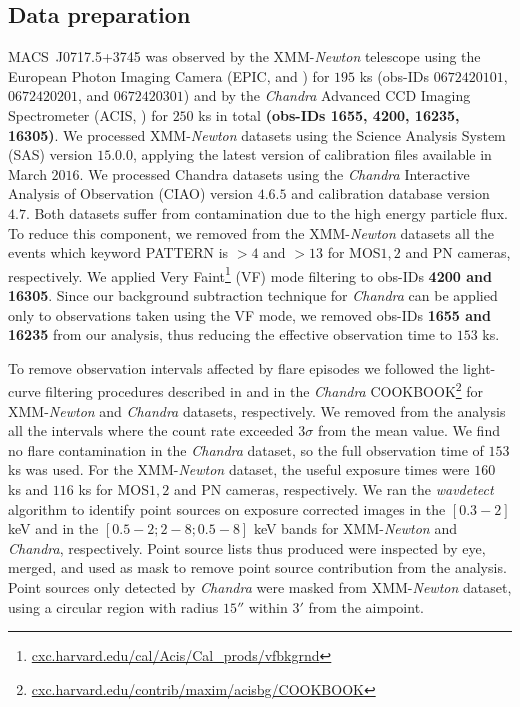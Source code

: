 \documentclass[twocolumn,traditabstract]{aa}
\begin{document}
\subsection{Data preparation}
\mbox{MACS~J0717.5+3745} was observed by the XMM-\textit{Newton} telescope using the European Photon Imaging Camera (EPIC, \citealt{turner2001} and \citealt{struder2001}) for $195$ ks (obs-IDs $0672420101$, $0672420201$, and $0672420301$) and by the \textit{Chandra} Advanced CCD Imaging Spectrometer (ACIS, \citealt{garmire2003}) for $250$ ks in total {\bf (obs-IDs 1655, 4200, 16235, 16305)}. We processed XMM-\textit{Newton} datasets using the Science Analysis System (SAS) version $15.0.0$, applying the latest version of calibration files available in March $2016$. We processed Chandra datasets using the \textit{Chandra} Interactive Analysis of Observation (CIAO) version $4.6.5$ and calibration database version $4.7$. Both datasets suffer from contamination due to the high energy particle flux. To reduce this component, we removed from the XMM-\textit{Newton} datasets all the events which keyword PATTERN is $>4$ and $>13$ for MOS$1,2$ and PN cameras, respectively. We applied Very Faint\footnote{\url{cxc.harvard.edu/cal/Acis/Cal\_prods/vfbkgrnd}} (VF) mode filtering to obs-IDs {\bf 4200 and 16305}. Since our background subtraction technique for \textit{Chandra} can be applied only to observations taken using the VF mode, we removed obs-IDs {\bf 1655 and 16235} from our analysis, thus reducing the effective observation time to $153$ ks.
 
To remove observation intervals affected by flare episodes we followed the light-curve filtering procedures described in \cite{pratt2007} and in the \textit{Chandra} COOKBOOK\footnote{\url{cxc.harvard.edu/contrib/maxim/acisbg/COOKBOOK}} for XMM-\textit{Newton} and \textit{Chandra} datasets, respectively. We removed from the analysis all the intervals where the count rate exceeded $3\sigma$ from the mean value. We find no flare contamination in the \textit{Chandra} dataset, so the full observation time of $153$ ks was used. For the XMM-\textit{Newton} dataset, the useful exposure times were $160$ ks and $116$ ks for MOS$1,2$ and PN cameras, respectively. We ran the \textit{wavdetect} algorithm \citep{freeman2002} to identify point sources on exposure corrected images in the $[0.3-2]$ keV and in the $[0.5-2 ; 2-8 ; 0.5-8]$ keV bands for XMM-\textit{Newton} and \textit{Chandra}, respectively. Point source lists thus produced were inspected by eye, merged, and used as mask to remove point source contribution from the analysis. Point sources only detected by \textit{Chandra} were masked from XMM-\textit{Newton} dataset, using a circular region with radius $15''$ within $3'$ from the aimpoint.
\end{document}
